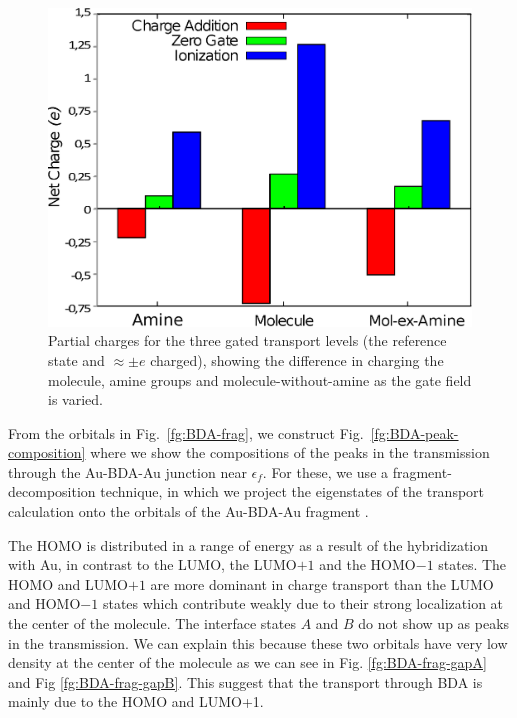 \documentclass[aip,jcp,a4paper,reprint,floatfix,superscriptaddress]{revtex4-1}
\begin{document}
\begin{figure}
\includegraphics[width=.8\columnwidth]{img/gating-BDA-GGA-N}
\caption{Partial charges for the three gated transport levels (the reference state and $\approx\pm e$ charged), showing the difference in charging the molecule, amine groups and molecule-without-amine as the gate field is varied.} \label{fg:gated_charges_BDA}
\end{figure}

From the orbitals in Fig.~\ref{fg:BDA-frag},  we construct Fig.~\ref{fg:BDA-peak-composition} where we show the compositions of the peaks in the transmission through the Au-BDA-Au junction near $\epsilon_{f}$. For these, we use a fragment-decomposition technique, in which we project the eigenstates of the transport calculation onto the orbitals of the Au-BDA-Au fragment \cite{Verzijl2012}. 

The HOMO is distributed in a range of energy as a result of the hybridization with Au, in contrast to the LUMO, the LUMO$+1$ and the HOMO$-1$ states. The HOMO and LUMO$+1$ are more dominant in charge transport than the LUMO and HOMO$-1$ states which contribute weakly due to their strong localization at the center of the molecule. The interface states ${A}$ and ${B}$ do not show up as peaks in the transmission. We can explain this because these two orbitals have very low density at the center of the molecule as we can see in Fig. \ref{fg:BDA-frag-gapA} and Fig \ref{fg:BDA-frag-gapB}. This suggest that the transport through BDA is mainly due to the HOMO and LUMO+1. 
\end{document}
